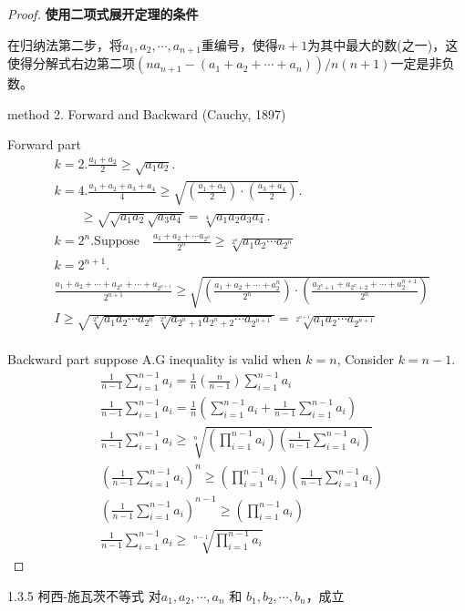 \begin{proof}
\textbf{使用二项式展开定理的条件}

在归纳法第二步，将$ a_1,a_2,\cdots,a_{n+1} $重编号，使得$ {n+1} $为其中最大的数(之一)，这使得分解式右边第二项$ (na_{n+1}-(a_1+a_2+\cdots+a_n))/n(n+1) $一定是非负数。

method 2. Forward and Backward (Cauchy, 1897)

Forward part
\begin{align*}
	&k = 2. \frac{a_1+a_2}{2}\ge \sqrt{a_1a_2}.\\
	&k = 4. \frac{a_1+a_2+a_3+a_4}{4} \ge\sqrt{(\frac{a_1+a_2}{2})\cdot(\frac{a_3+a_4}{2})}.\\
	&\qquad  \ge \sqrt{\sqrt{a_1a_2}\sqrt{a_3a_4}} = \sqrt[4]{a_1a_2a_3a_4}.\\
	&k = 2^n. \text{Suppose}\quad \frac{a_1+a_2+\cdots a_{2^n}}{2^n} \ge \sqrt[2^n]{a_1a_2\cdots a_{2^n}}\\
	&k = 2^{n+1}.\\
	&	\frac{a_1+a_2+\cdots+a_{2^n}+\cdots+a_{2^{n+1}}}{2^{n+1}} \ge \sqrt{(\frac{a_1+a_2+\cdots+a_2^{n}}{2^n})\cdot(\frac{a_{2^{n} + 1}+a_{2^{n}+2}+\cdots+a_2^{n+1}}{2^n})}\\
	&I\ge \sqrt{\sqrt[2^n]{a_1a_2\cdots a_{2^n}}\sqrt[2^n]{a_{2^n+1} a_{2^n+2}\cdots a_{2^{n+1}}}} = \sqrt[2^{n+1}]{a_1a_2\cdots a_{2^{n+1}}}\\
\end{align*}

Backward part
suppose A.G inequality is valid when $ k = n $, Consider $ k = n-1 $.
\begin{align*}
	&\frac{1}{n-1}\sum_{i=1}^{n-1} a_i = \frac{1}{n}(\frac{n}{n-1})\sum_{i=1}^{n-1}a_i\\
	&\frac{1}{n-1}\sum_{i=1}^{n-1} a_i = \frac{1}{n}(\sum_{i=1}^{n-1} a_i + \frac{1}{n-1} \sum_{i=1}^{n-1} a_i)\\
	&\frac{1}{n-1} \sum_{i=1}^{n-1} a_i \ge \sqrt[n]{(\prod_{i=1}^{n-1} a_i)(\frac{1}{n-1}\sum_{i=1}^{n-1} a_i)}\\
	&(\frac{1}{n-1} \sum_{i=1}^{n-1} a_i)^n \ge (\prod_{i=1}^{n-1} a_i)(\frac{1}{n-1}\sum_{i=1}^{n-1} a_i)\\
	&(\frac{1}{n-1} \sum_{i=1}^{n-1} a_i)^{n-1} \ge (\prod_{i=1}^{n-1} a_i)\\
	&\frac{1}{n-1} \sum_{i=1}^{n-1} a_i \ge \sqrt[n-1]{\prod_{i=1}^{n-1} a_i}
\end{align*}
\end{proof}

\begin{proposition}
	{1.3.5 柯西-施瓦茨不等式}
	对$ a_1,a_2,\cdots,a_n $ 和 $ b_1,b_2,\cdots,b_n $，成立
\end{proposition}


